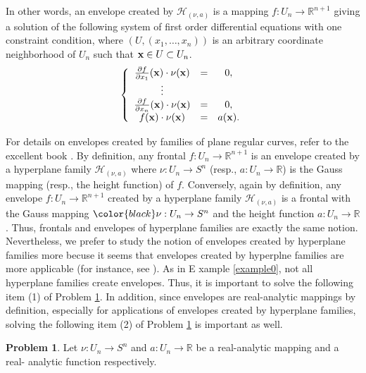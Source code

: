 \documentclass{amsart}
\theoremstyle{definition}
\theoremstyle{definition}
\theoremstyle{definition}
\newtheorem{problem}{Problem}
\newcommand{\ch}[1]{{\color{black} #1}}
\begin{document}
{In other words, an {envelope created by} %
$\mathcal{H}_{\left(\nu, a\right)}$ 
is a mapping $f: U_n\to \mathbb{R}^{n+1}$ giving a solution  
of the following system of first order differential equations with one constraint 
condition, where $\left(U, \left(x_1, \ldots, x_n\right)\right)$ 
is an arbitrary coordinate neighborhood of $U_n$ such that 
${\bf x}\in U\subset U_n$.      
\[
\left\{
\begin{array}{ccc}
\frac{\partial f}{\partial x_1}({\bf x})\cdot 
\nu({\bf x}) & = & 0, \\ 
 \vdots & { } & { } \\
\frac{\partial f}{\partial x_n}({\bf x})
\cdot \nu({\bf x}) & = & 0, \\ 
f({\bf x})\cdot \nu({\bf x}) & = & a({\bf x}).     
\end{array}
\right.
\]  
\par 
\noindent 
For details on envelopes created by families of plane regular curves, 
refer to \ch{the} excellent book 
\cite{brucegiblin}.    
By definition, any frontal $f: U_n\to \mathbb{R}^{n+1}$ is an envelope created 
by a hyperplane family 
$\mathcal{H}_{(\nu, a)}$ where $\nu: U_n\to S^n$ 
(resp., $a: U_n\to \mathbb{R}$) is the Gauss mapping (resp., the height function) 
of $f$.     Conversely, again by definition, 
any envelope $f: U_n\to \mathbb{R}^{n+1}$ 
created by a hyperplane family 
$\mathcal{H}_{\left(\nu, a\right)}$ 
is a frontal with the Gauss mapping $\ch{\nu}: U_n\to S^n$ and the 
height function $a: U_n\to \mathbb{R}$.     
Thus, frontals and envelopes of hyperplane families are exactly  
the same notion.     
Nevertheless, we prefer to study  
the notion of envelopes created by hyperplane families more 
becuse it seems that envelopes created by hyperplne families are 
more applicable (for instance, see \cite{quantum_entanglement}).   
As in E\ch{xa}mple \ref{example0}, not all hyperplane families create 
envelopes.     Thus, it is important to solve the following \ch{item} (1) of 
Problem \ref{problem1}.    
In addition, since envelopes are real-analytic mappings by definition, 
especially for applications of envelopes created by hyperplane families, 
solving the following \ch{item} (2) of Problem \ref{problem1} is important as well.    
\begin{problem}\label{problem1}
Let $\nu: U_n\to S^n$ and $a: U_n\to \mathbb{R}$ 
be a real-analytic mapping and a real- analytic function respectively.   
\begin{enumerate}

\end{enumerate}
\end{problem}}
\end{document}
